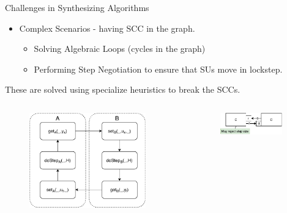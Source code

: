 \documentclass{beamer}
\begin{document}
\begin{frame}{Challenges in Synthesizing Algorithms}
    \begin{itemize}
        \item Complex Scenarios - having SCC in the graph.
        \begin{itemize}
            \item Solving Algebraic Loops (cycles in the graph)
            \item Performing Step Negotiation to ensure that SUs move in lockstep.
        \end{itemize}
    \end{itemize}
    These are solved using specialize heuristics to break the SCCs.
    \begin{columns}[T] 
        \begin{column}{.48\textwidth}
            \begin{figure}    
                \includegraphics[width=0.9\textwidth]{images/reactive_step_graph.pdf}
            \end{figure}  
        \end{column}
    \hfill%
    \begin{column}{.48\textwidth}
        \begin{figure}    
            \centering
            \includegraphics[width=0.9\textwidth]{images/step_scenario_org.pdf}
        \end{figure}
    \end{column}
    \end{columns}
\end{frame}
\end{document}

